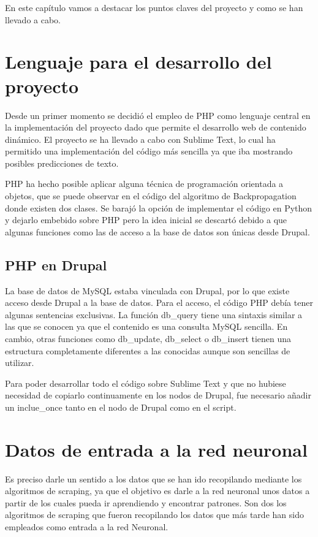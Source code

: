 
En este capítulo vamos a destacar los puntos claves del proyecto y como se han llevado a cabo.

\section{Lenguaje para el desarrollo del proyecto}

Desde un primer momento se decidió el empleo de PHP como lenguaje central en la implementación del proyecto dado que permite el desarrollo web de contenido dinámico. El proyecto se ha llevado a cabo con Sublime Text, lo cual ha permitido una implementación del código más sencilla ya que iba mostrando posibles predicciones de texto.

PHP ha hecho posible aplicar alguna técnica de programación orientada a objetos, que se puede observar en el código del algoritmo de Backpropagation donde existen dos clases.
Se barajó la opción de implementar el código en Python y dejarlo embebido sobre PHP pero la idea inicial se descartó debido a que algunas funciones como las de acceso a la base de datos son únicas desde Drupal.

\subsection{PHP en Drupal}
La base de datos de MySQL estaba vinculada con Drupal, por lo que existe acceso desde Drupal a la base de datos. Para el acceso, el código PHP debía tener algunas sentencias exclusivas. La función db\_query tiene una sintaxis similar a las que se conocen ya que el contenido es una consulta MySQL sencilla. En cambio, otras funciones como db\_update, db\_select o db\_insert tienen una estructura completamente diferentes a las conocidas aunque son sencillas de utilizar.

Para poder desarrollar todo el código sobre Sublime Text y que no hubiese necesidad de copiarlo continuamente en los nodos de Drupal, fue necesario añadir un inclue\_once tanto en el nodo de Drupal como en el script.

\section{Datos de entrada a la red neuronal}
Es preciso darle un sentido a los datos que se han ido recopilando mediante los algoritmos de scraping, ya que el objetivo es darle a la red neuronal unos datos a partir de los cuales pueda ir aprendiendo y encontrar patrones. Son dos los algoritmos de scraping que fueron recopilando los datos que más tarde han sido empleados como entrada a la red Neuronal.

